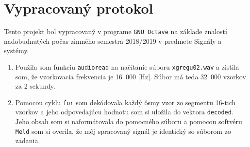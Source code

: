 \documentclass[10pt, a4paper, twocolumn]{article}
\begin{document}
\section*{Vypracovaný protokol}
Tento projekt bol vypracovaný v programe \texttt{GNU Octave} na základe znalostí nadobudnutých počas zimného semestra 2018/2019 v predmete Signály a systémy.

\begin{enumerate}[leftmargin=*]
\item Použila som funkciu \texttt{audioread} na načítanie súboru \texttt{xgregu02.wav} a zistila som, že vzorkovacia frekvencia je 16~000 [Hz]. Súbor má teda 32~000 vzorkov za 2 sekundy.

\item Pomocou cyklu \texttt{for} som dekódovala každý ôsmy vzor zo segmentu 16-tich vzorkov a jeho odpovedajúcu hodnotu som si uložila do vektora \texttt{decoded}. Jeho obsah som si naformátovala do pomocného súboru a pomocou softvéru \texttt{Meld} som si overila, že môj spracovaný signál je identický so súborom zo zadania.

\begin{figure}[H]
\centering
{}
\end{figure}


\end{enumerate}
\end{document}
